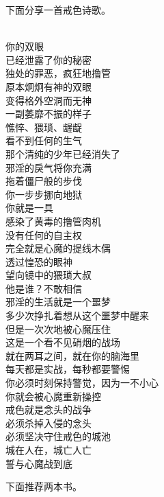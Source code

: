 下面分享一首戒色诗歌。

\begin{poem}[戒色的城池]
    \begin{multicols}{2}
        \centering~\\
        你的双眼 \\ 已经泄露了你的秘密 \\ 独处的罪恶，疯狂地撸管 \\ 原本炯炯有神的双眼 \\ 变得格外空洞而无神 \\ 一副萎靡不振的样子 \\ 憔悴、猥琐、龌龊 \\ 看不到任何的生气 \\ 那个清纯的少年已经消失了 \\ 邪淫的戾气将你充满 \\ 拖着僵尸般的步伐 \\ 你一步步挪向地狱 \\ 你就是一具 \\ 感染了黄毒的撸管肉机 \\ 没有任何的自主权 \\ 完全就是心魔的提线木偶 \\ 透过惶恐的眼神 \\ 望向镜中的猥琐大叔 \\ 他是谁？不敢相信 \\ 邪淫的生活就是一个噩梦 \\ 多少次挣扎着想从这个噩梦中醒来 \\ 但是一次次地被心魔压住 \\ 这是一个看不见硝烟的战场 \\ 就在两耳之间，就在你的脑海里 \\ 每天都是实战，每秒都要警惕 \\ 你必须时刻保持警觉，因为一不小心 \\ 你就会被心魔重新操控 \\ 戒色就是念头的战争 \\ 必须杀掉入侵的念头 \\ 必须坚决守住戒色的城池 \\ 城在人在，城亡人亡 \\ 誓与心魔战到底
    \end{multicols}
\end{poem}

下面推荐两本书。

